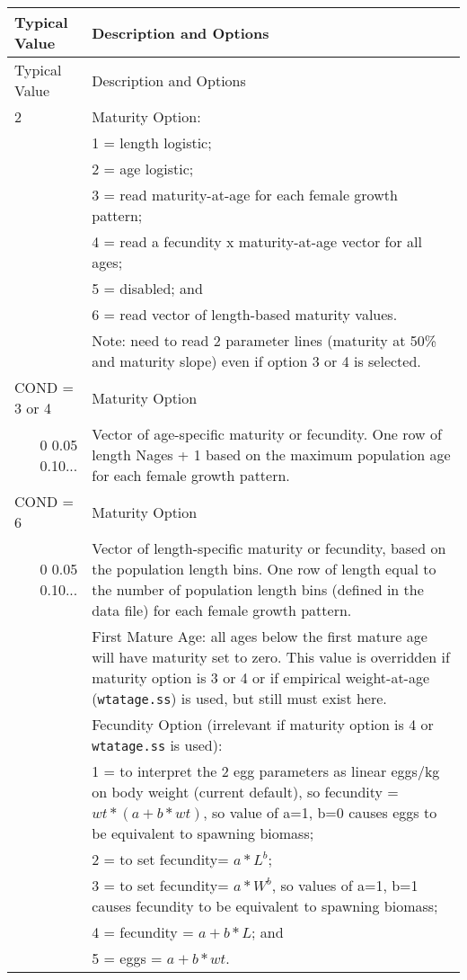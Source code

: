\begin{longtable}{p{0.5cm} p{2cm} p{13cm}}
	\hline	
	\multicolumn{2}{l}{Typical Value} & Description and Options \Tstrut\Bstrut\\
	\hline
	\endfirsthead

	\hline
	\multicolumn{2}{l}{Typical Value} & Description and Options \Tstrut\Bstrut\\
	\hline
	\endhead
	\hline

	\endfoot
	
	\endlastfoot

	2 & & Maturity Option: \Tstrut\\
	  & & 1 = length logistic; \\
	  & & 2 = age logistic; \\
	  & & 3 = read maturity-at-age for each female growth pattern; \\
	  & & 4 = read a fecundity x maturity-at-age vector for all ages; \\
	  & & 5 = disabled; and \\
	  & & 6 = read vector of length-based maturity values. \\
	  & & Note: need to read 2 parameter lines (maturity at 50\% and maturity slope) even if option 3 or 4 is selected. \Bstrut\\
	\hline

	\multicolumn{2}{l}{COND = 3 or 4} & Maturity Option \Tstrut\\
	\multicolumn{2}{r}{0 0.05 0.10...} & Vector of age-specific maturity or fecundity. One row of length Nages + 1 based on the maximum population age for each female growth pattern. \Bstrut\\
	\multicolumn{2}{l}{COND = 6} & Maturity Option \Tstrut\\
	\multicolumn{2}{r}{0 0.05 0.10...} & Vector of length-specific maturity or fecundity, based on the population length bins. One row of length equal to the number of population length bins (defined in the data file) for each female growth pattern. \Bstrut\\
	\hline
	
	\Tstrut 1 & & First Mature Age: all ages below the first mature age will have maturity set to zero. This value is overridden if maturity option is 3 or 4 or if empirical weight-at-age (\verb|wtatage.ss|) is used, but still must exist here. \Bstrut\\
	\hline

	\Tstrut 1 & & Fecundity Option (irrelevant if maturity option is 4 or \verb|wtatage.ss| is used): \\
	  & & 1 = to interpret the 2 egg parameters as linear eggs/kg on body weight (current default), so fecundity = $wt * (a+b*wt)$, so value of a=1, b=0 causes eggs to be equivalent to spawning biomass; \\
	  & & 2 = to set fecundity= $a*L^ b$; \\
	  & & 3 = to set fecundity= $a*W^ b$, so values of a=1, b=1 causes fecundity to be equivalent to spawning biomass; \\
	  & & 4 = fecundity = $a+b*L$; and \\
	  & & 5 = eggs = $a+b*wt$. \Bstrut\\
	\hline
\end{longtable}

